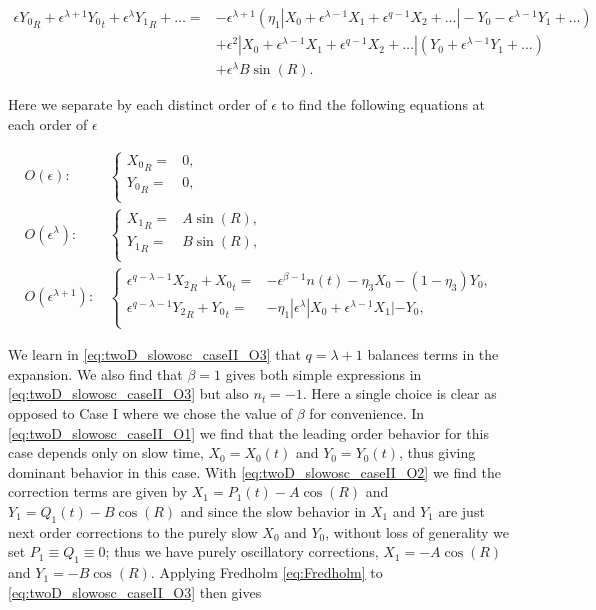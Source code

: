 \begin{equation*}
\begin{aligned}
\epsilon {Y_0}_R+\epsilon^{\lambda+1}{Y_0}_t+\epsilon^\lambda {Y_1}_R+\ldots=& -\epsilon^{\lambda+1}(\eta_1|X_0 +\epsilon^{\lambda-1} X_1+\epsilon^{q-1} X_2+\ldots|- Y_0-\epsilon^{\lambda-1} Y_1+\ldots)\\
&+\epsilon^2|X_0 +\epsilon^{\lambda-1} X_1+\epsilon^{q-1} X_2+\ldots|(Y_0 +\epsilon^{\lambda-1} Y_1+\ldots)\\
&+\epsilon^\lambda B \sin (R).
\end{aligned}
\end{equation*}

Here we separate by each distinct order of $\epsilon$ to find the following equations at each order of $\epsilon$

\begin{align} \label{eq:twoD_slowosc_caseII_O1}
O(\epsilon):\, &\begin{cases}
	{X_0}_R =& 0, \\
	{Y_0}_R =& 0,\\
\end{cases}\\ \label{eq:twoD_slowosc_caseII_O2}
O(\epsilon^\lambda): \, & \begin{cases}
	{X_1}_R =& A\sin(R), \\
	{Y_1}_R =& B\sin(R),\\
\end{cases}\\
\label{eq:twoD_slowosc_caseII_O3}
O(\epsilon^{\lambda+1}):\, &\begin{cases}
	\epsilon^{q-\lambda-1}{X_2}_R+{X_0}_t =& -\epsilon^{\beta-1}n(t)-\eta_3X_0-(1-\eta_3)Y_0, \\
	\epsilon^{q-\lambda-1}{Y_2}_R+{Y_0}_t =& -\eta_1|\epsilon^{\lambda}|X_0+\epsilon^{\lambda-1}X_1|-Y_0,\\
\end{cases}
\end{align}

We learn in \eqref{eq:twoD_slowosc_caseII_O3} that $q=\lambda+1$ balances terms in the expansion. We also find that $\beta =1$ gives both simple expressions in \eqref{eq:twoD_slowosc_caseII_O3} but also $n_t=-1$. Here a single choice is clear as opposed to Case I where we chose the value of $\beta$ for convenience. In \eqref{eq:twoD_slowosc_caseII_O1} we find that the leading order behavior for this case depends only on slow time, $X_0=X_0(t)$ and $Y_0=Y_0(t)$, thus giving dominant behavior in this case. With \eqref{eq:twoD_slowosc_caseII_O2} we find the correction terms are given by $X_1=P_1(t)-A\cos(R)$ and $Y_1=Q_1(t)-B\cos(R)$ and since the slow behavior in $X_1$ and $Y_1$ are just next order corrections to the purely slow $X_0$ and $Y_0$, without loss of generality we set $P_1\equiv Q_1\equiv 0$; thus we have purely oscillatory corrections, $X_1=-A\cos(R)$ and $Y_1=-B\cos(R)$. Applying Fredholm \eqref{eq:Fredholm} to \eqref{eq:twoD_slowosc_caseII_O3} then gives


